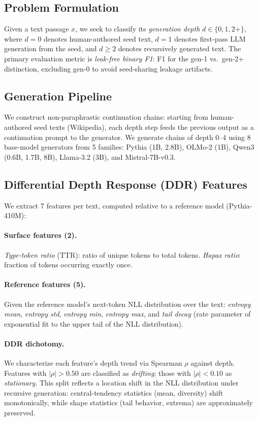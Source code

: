 \documentclass[11pt,a4paper]{article}
\begin{document}
\subsection{Problem Formulation}

Given a text passage $x$, we seek to classify its \emph{generation depth} $d \in \{0, 1, 2+\}$, where $d=0$ denotes human-authored seed text, $d=1$ denotes first-pass LLM generation from the seed, and $d \geq 2$ denotes recursively generated text. The primary evaluation metric is \emph{leak-free binary F1}: F1 for the gen-1 vs.\ gen-2+ distinction, excluding gen-0 to avoid seed-sharing leakage artifacts.

\subsection{Generation Pipeline}

We construct non-paraphrastic continuation chains: starting from human-authored seed texts (Wikipedia), each depth step feeds the previous output as a continuation prompt to the generator. We generate chains of depth 0--4 using 8 base-model generators from 5 families: Pythia (1B, 2.8B), OLMo-2 (1B), Qwen3 (0.6B, 1.7B, 8B), Llama-3.2 (3B), and Mistral-7B-v0.3.

\subsection{Differential Depth Response (DDR) Features}

We extract 7 features per text, computed relative to a reference model (Pythia-410M):

\paragraph{Surface features (2).} \emph{Type-token ratio} (TTR): ratio of unique tokens to total tokens. \emph{Hapax ratio}: fraction of tokens occurring exactly once.

\paragraph{Reference features (5).} Given the reference model's next-token NLL distribution over the text: \emph{entropy mean}, \emph{entropy std}, \emph{entropy min}, \emph{entropy max}, and \emph{tail decay} (rate parameter of exponential fit to the upper tail of the NLL distribution).

\paragraph{DDR dichotomy.} We characterize each feature's depth trend via Spearman $\rho$ against depth. Features with $|\rho| > 0.50$ are classified as \emph{drifting}; those with $|\rho| < 0.10$ as \emph{stationary}. This split reflects a location shift in the NLL distribution under recursive generation: central-tendency statistics (mean, diversity) shift monotonically, while shape statistics (tail behavior, extrema) are approximately preserved.
\end{document}
